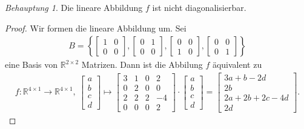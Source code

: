 \documentclass[draft,a5paper]{article}
\theoremstyle{remark}
\newtheorem*{beh}{Behauptung}
\begin{document}
\begin{beh}
  Die lineare Abbildung \(f\) ist nicht diagonalisierbar.
\end{beh}

\begin{proof}
  Wir formen die lineare Abbildung um.  Sei
  \begin{align*}
    B = \left\{
    \begin{bmatrix}
      1 & 0 \\
      0 & 0
    \end{bmatrix},
    \begin{bmatrix}
      0 & 1 \\
      0 & 0
    \end{bmatrix},
    \begin{bmatrix}
      0 & 0 \\
      1 & 0
    \end{bmatrix},
    \begin{bmatrix}
      0 & 0 \\
      0 & 1
    \end{bmatrix}
    \right\}
  \end{align*}
  eine Basis von \(\mathbb{R}^{2 \times 2}\) Matrizen.  Dann ist die Abbilung
  \(f\) äquivalent zu
  \begin{align*}
    f\colon \mathbb{R}^{4\times1} \to \mathbb{R}^{4\times1},~
    \begin{bmatrix}
      a \\ b \\ c \\ d
    \end{bmatrix}
    \mapsto
    \begin{bmatrix}
      3 & 1 & 0 & 2 \\
      0 & 2 & 0 & 0 \\
      2 & 2 & 2 & -4 \\
      0 & 0 & 0 & 2
    \end{bmatrix} \cdot
    \begin{bmatrix}
      a \\ b \\ c \\ d
    \end{bmatrix}
    =
    \begin{bmatrix}
      3a+b-2d \\
      2b \\
      2a+2b+2c-4d \\
      2d
    \end{bmatrix}.
  \end{align*}

\end{proof}
\end{document}
